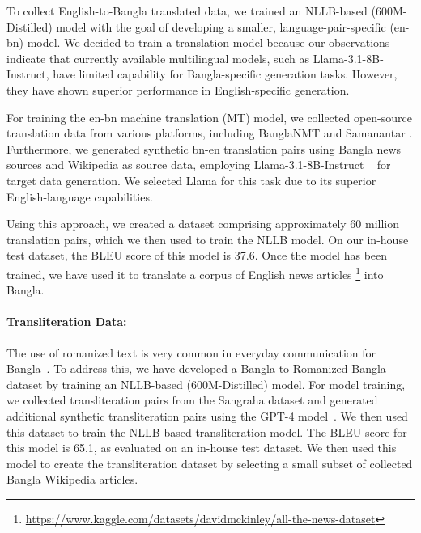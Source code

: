 
To collect English-to-Bangla translated data, we trained an NLLB-based (600M-Distilled) model \cite{nllbteam2022languageleftbehindscaling} with the goal of developing a smaller, language-pair-specific (en-bn) model. We decided to train a translation model because our observations indicate that currently available multilingual models, such as Llama-3.1-8B-Instruct, have limited capability for Bangla-specific generation tasks. However, they have shown superior performance in English-specific generation.

For training the en-bn machine translation (MT) model, we collected open-source translation data from various platforms, including BanglaNMT \cite{hasan-etal-2020-low} and Samanantar \cite{ramesh-etal-2022-samanantar}. Furthermore, we generated synthetic bn-en translation pairs using Bangla news sources and Wikipedia as source data, employing Llama-3.1-8B-Instruct ~\cite{touvron2023llama} for target data generation. We selected Llama for this task due to its superior English-language capabilities.

Using this approach, we created a dataset comprising approximately 60 million translation pairs, which we then used to train the NLLB model. On our in-house test dataset, the BLEU score of this model is 37.6. Once the model has been trained, we have used it to translate a corpus of English news articles \footnote{\url{https://www.kaggle.com/datasets/davidmckinley/all-the-news-dataset}} into Bangla.


\paragraph{Transliteration Data:}
The use of romanized text is very common in everyday communication for Bangla~\cite{fahim2024banglatlit}. To address this, we have developed a Bangla-to-Romanized Bangla dataset by training an NLLB-based (600M-Distilled) model. For model training, we collected transliteration pairs from the Sangraha dataset and generated additional synthetic transliteration pairs using the GPT-4 model~\cite{achiam2023gpt4}. We then used this dataset to train the NLLB-based transliteration model. The BLEU score for this model is 65.1, as evaluated on an in-house test dataset. We then used this model to create the transliteration dataset by selecting a small subset of collected Bangla Wikipedia articles.

